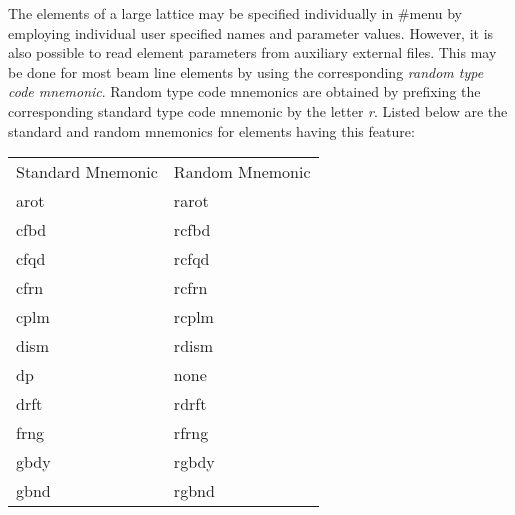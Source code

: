          The elements of a large lattice may be specified individually in
\#menu by employing individual user specified names and parameter values.
However, it is also possible to read element parameters from auxiliary
external files.  This may be done for most beam line elements by using the
corresponding {\em random type code mnemonic}.  Random type code mnemonics are
obtained by prefixing the corresponding standard type code mnemonic by the
letter {\em r}.  Listed below are the standard and random mnemonics for elements
having this feature:
\newpage

\begin{center}
\begin{tabular}{ll}
\multicolumn{1}{c}{Standard Mnemonic} &
\multicolumn{1}{c}{Random Mnemonic} \\
\hspace{4em}arot                 &\hspace{3em}rarot \\
\hspace{4em}cfbd                 &\hspace{3em}rcfbd \\
\hspace{4em}cfqd                 &\hspace{3em}rcfqd \\
\hspace{4em}cfrn                 &\hspace{3em}rcfrn \\
\hspace{4em}cplm                 &\hspace{3em}rcplm \\
\hspace{4em}dism                 &\hspace{3em}rdism \\
\hspace{4em}dp                   &\hspace{3em}none  \\
\hspace{4em}drft                 &\hspace{3em}rdrft \\
\hspace{4em}frng                 &\hspace{3em}rfrng \\
\hspace{4em}gbdy                 &\hspace{3em}rgbdy \\
\hspace{4em}gbnd                 &\hspace{3em}rgbnd \\

\end{tabular}
\end{center}
